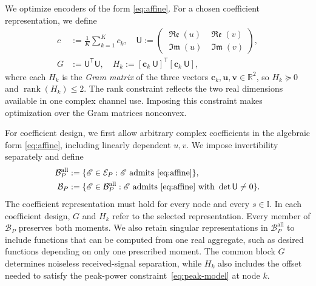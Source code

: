 \documentclass[journal,12pt,onecolumn,draftclsnofoot]{IEEEtran}
\newcommand{\enc}{\mathscr{E}}\newcommand{\dec}{\mathscr{D}}\newcommand{\R}{\mathbb R}\newcommand{\C}{\mathbb C}
\newcommand{\T}{\mathsf T}\newcommand{\suc}{\succeq}
\renewcommand{\Re}{\mathop{\mathfrak{Re}}\nolimits}
\renewcommand{\Im}{\mathop{\mathfrak{Im}}\nolimits}
\begin{document}
We optimize encoders of the form \eqref{eq:affine}. For a chosen
coefficient representation, we define
\begin{subequations}
\begin{align}
c&:=\frac1K\sum_{k=1}^Kc_k,
\quad \mathsf U:=
\begin{pmatrix}
 \Re (u) & \Re (v)\\
 \Im (u) & \Im (v)
\end{pmatrix},\\
G&:=\mathsf U^\T\mathsf U,
\quad H_k:=[\boldsymbol c_k\ \mathsf U]^\T
     [\boldsymbol c_k\ \mathsf U],
\end{align}
\end{subequations}
where each $H_k$ is the \emph{Gram matrix} of the three vectors
$\boldsymbol c_k,\boldsymbol u,\boldsymbol v\in\R^2$, so
$H_k\succeq0$ and $\operatorname{rank}(H_k)\le2$.
The rank constraint reflects the two real dimensions available in one complex channel use. Imposing this constraint makes optimization over the Gram matrices nonconvex.





For coefficient design, we first allow arbitrary complex coefficients in the algebraic form \eqref{eq:affine}, including linearly dependent $u,v$. We impose invertibility separately and define
$$
\begin{aligned}
\mathcal B_P^{\mathrm{all}}
&:=\{\enc\in\mathcal E_P:
\enc\text{ admits }\eqref{eq:affine}\},\\
\mathcal B_P
&:=\{\enc\in\mathcal B_P^{\mathrm{all}}:
\enc\text{ admits }\eqref{eq:affine}\text{ with }\det\mathsf U\ne0\}.
\end{aligned}
$$
The coefficient representation must hold for every node and every $s\in\mathbb I$.
In each coefficient design, $G$ and $H_k$ refer
to the selected representation. Every member of $\mathcal B_P$
preserves both moments. We also retain singular representations in
$\mathcal B_P^{\mathrm{all}}$ to include functions that can be
computed from one real aggregate, such as desired functions
depending on only one prescribed moment.
The common block $G$ determines noiseless received-signal separation, while $H_k$ also includes the offset needed to satisfy the peak-power
constraint~\eqref{eq:peak-model} at node $k$.
\end{document}
